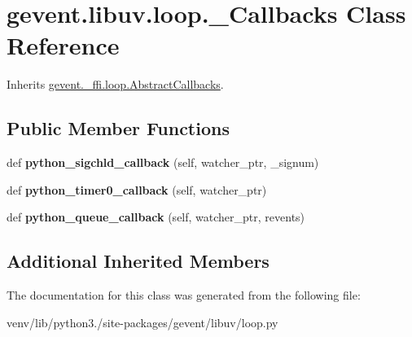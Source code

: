 \hypertarget{classgevent_1_1libuv_1_1loop_1_1___callbacks}{}\section{gevent.\+libuv.\+loop.\+\_\+\+Callbacks Class Reference}
\label{classgevent_1_1libuv_1_1loop_1_1___callbacks}


Inherits \hyperlink{classgevent_1_1__ffi_1_1loop_1_1_abstract_callbacks}{gevent.\+\_\+ffi.\+loop.\+Abstract\+Callbacks}.

\subsection*{Public Member Functions}
\begin{DoxyCompactItemize}
\item 
\mbox{\label{classgevent_1_1libuv_1_1loop_1_1___callbacks_a463892ea863685f186e5044b77281c5e}} 
def {\bfseries python\+\_\+sigchld\+\_\+callback} (self, watcher\+\_\+ptr, \+\_\+signum)
\item 
\mbox{\label{classgevent_1_1libuv_1_1loop_1_1___callbacks_a49fd24d35c3a455843438e993d442c51}} 
def {\bfseries python\+\_\+timer0\+\_\+callback} (self, watcher\+\_\+ptr)
\item 
\mbox{\label{classgevent_1_1libuv_1_1loop_1_1___callbacks_ab33a9f669b7e35a9c5c332487173f8f7}} 
def {\bfseries python\+\_\+queue\+\_\+callback} (self, watcher\+\_\+ptr, revents)
\end{DoxyCompactItemize}
\subsection*{Additional Inherited Members}


The documentation for this class was generated from the following file\+:\begin{DoxyCompactItemize}
\item 
venv/lib/python3./site-\/packages/gevent/libuv/loop.\+py\end{DoxyCompactItemize}

